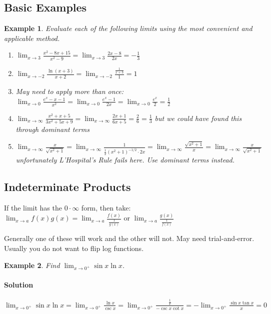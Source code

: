 \documentclass[letterpaper, 11pt, openany]{book}
\theoremstyle{mytheoremstyle}
\theoremstyle{myexamplestyle}
\newtheorem{example}{Example}[section]
\newenvironment{solution}{\paragraph{\sffamily \smaller \fontseries{b}\selectfont Solution}}{\hfill\faSquare}
\begin{document}
\subsection{Basic Examples}
\begin{example}\label{e:lhr-basics}
    Evaluate each of the following limits using the most convenient and applicable method.
    \begin{enumerate}
        \item \(\displaystyle \lim_{x \to 3} \frac{x^{2} - 8x + 15}{x^{2} - 9} = \lim_{x \to 3} \frac{2x - 8}{2x} = -\frac{1}{3}\)
        \item \(\displaystyle \lim_{x \to -2} \frac{\ln(x+3)}{x + 2} = \lim_{x \to -2} \frac{\frac{1}{x+3}}{1} = 1\)
        \item May need to apply more than once: \(\displaystyle \lim_{x \to 0} \frac{e^{x} - x - 1}{x^{2}} = \lim_{x \to 0} \frac{e^{x} - 1}{2x} = \lim_{x \to 0} \frac{e^{x}}{2} = \frac{1}{2}\)
        \item \(\displaystyle \lim_{x \to \infty} \frac{x^{2} + x + 5}{3x^2 + 5x + 9} = \lim_{x \to \infty} \frac{2x + 1}{6x + 5} = \frac{2}{6} = \frac{1}{3}\) but we could have found this through dominant terms \faMeh
        \item \(\displaystyle \lim_{x \to \infty} \frac{x}{\sqrt{x^{2} + 1}} = \lim_{x \to \infty} \frac{1}{\frac{1}{2}(x^{2} + 1)^{-1/2}\cdot 2x} = \lim_{x \to \infty} \frac{\sqrt{x^{2} + 1}}{x} = \lim_{x \to \infty} \frac{x}{\sqrt{x^{2} + 1}}\) \faFrown \; unfortunately L'Hospital's Rule fails here. Use dominant terms instead.
    \end{enumerate}
\end{example}
\subsection{Indeterminate Products}
If the limit has the \(0 \cdot \infty\) form, then take:
\(\displaystyle \lim_{x \to a} f(x)g(x) = \lim_{x \to a} \frac{f(x)}{\frac{1}{g(x)}} \text{ or } \lim_{x \to a} \frac{g(x)}{\frac{1}{f(x)}}\)

Generally one of these will work and the other will not. May need trial-and-error. Usually you do not want to flip log functions.
\begin{example}
    Find \(\displaystyle \lim_{x \to 0^{+}} \sin x \ln x\).
    \begin{solution}
        \(\displaystyle \lim_{x \to 0^{+}} \sin x \ln x = \lim_{x \to 0^{+}} \frac{\ln x}{\csc x} = \lim_{x \to 0^{+}} \frac{\frac{1}{x}}{-\csc x \cot x} = - \lim_{x \to 0^{+}} \frac{\sin x \tan x}{x} = 0\)
    \end{solution}
\end{example}
\end{document}
